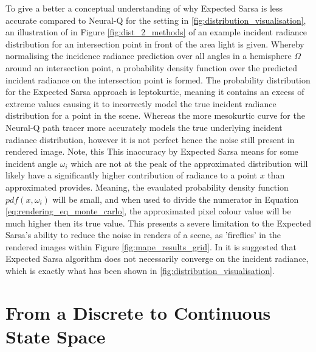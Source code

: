 \documentclass[../dissertation.tex]{subfiles}
\begin{document}
To give a better a conceptual understanding of why Expected Sarsa is less accurate compared to Neural-Q for the setting in \ref{fig:distribution_visualisation}, an illustration of in Figure \ref{fig:dist_2_methods} of an example incident radiance distribution for an intersection point in front of the area light is given. Whereby normalising the incidence radiance prediction over all angles in a hemisphere $\Omega$ around an intersection point, a probability density function over the predicted incident radiance on the intersection point is formed. The probability distribution for the Expected Sarsa approach is leptokurtic, meaning it contains an excess of extreme values causing it to incorrectly model the true incident radiance distribution for a point in the scene. Whereas the more mesokurtic curve for the Neural-Q path tracer more accurately models the true underlying incident radiance distribution, however it is not perfect hence the noise still present in rendered image. Note, this This inaccuracy by Expected Sarsa means for some incident angle $\omega_i$ which are not at the peak of the approximated distribution will likely have a significantly higher contribution of radiance to a point $x$ than approximated provides. Meaning, the evaulated probability density function $pdf(x, \omega_i)$ will be small, and when used to divide the numerator in Equation \ref{eq:rendering_eq_monte_carlo}, the approximated pixel colour value will be much higher then its true value. This presents a severe limitation to the Expected Sarsa's ability to reduce the noise in renders of a scene, as 'fireflies' in the rendered images  within Figure \ref{fig:mape_results_grid}. In \cite{dahm2017learning} it is suggested that Expected Sarsa algorithm does not necessarily converge on the incident radiance, which is exactly what has been shown in \ref{fig:distribution_visualisation}.

\section{From a Discrete to Continuous State Space}
\end{document}
